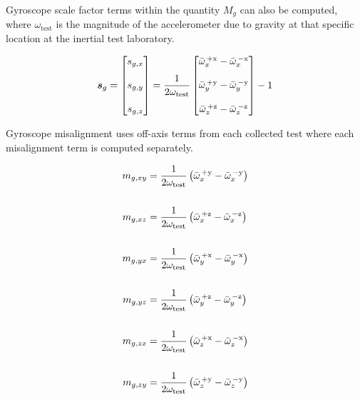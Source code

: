 Gyroscope scale factor terms within the quantity $M_g$ can also be computed, where $\omega_{\textrm{test}}$ is the magnitude of the accelerometer due to gravity at that specific location at the inertial test laboratory.

\begin{align} \label{eq: traditional gyro scale factor computation}
	\boldsymbol{s}_g = \begin{bmatrix} s_{g,x} \\ \\ s_{g,y} \\ \\ s_{g,z} \end{bmatrix} = \frac{1}{2\omega_{\textrm{test}}} \begin{bmatrix}
		\bar{\omega}^{\,+\textrm{x}}_{x} - \bar{\omega}^{\,-\textrm{x}}_{x} \\
		\\
		\bar{\omega}^{\,+\textrm{y}}_{y} - \bar{\omega}^{\,-\textrm{y}}_{y} \\
		\\
		\bar{\omega}^{\,+\textrm{z}}_{z} - \bar{\omega}^{\,-\textrm{z}}_{z}
	\end{bmatrix} - 1
\end{align}

Gyroscope misalignment uses off-axis terms from each collected test where each misalignment term is computed separately.

\begin{align} \label{eq: traditional gyro misalignment computation}
	m_{g,xy} &= \frac{1}{2\omega_{\textrm{test}}} \left( \bar{\omega}^{\,+\textrm{y}}_{x} - \bar{\omega}^{\,-\textrm{y}}_{x} \right) \notag\\
	\notag\\
	m_{g,xz} &= \frac{1}{2\omega_{\textrm{test}}} \left( \bar{\omega}^{\,+\textrm{z}}_{x} - \bar{\omega}^{\,-\textrm{z}}_{x} \right) \notag\\
	\notag\\
	m_{g,yx} &= \frac{1}{2\omega_{\textrm{test}}} \left( \bar{\omega}^{\,+\textrm{x}}_{y} - \bar{\omega}^{\,-\textrm{x}}_{y} \right) \notag\\
	\\
	m_{g,yz} &= \frac{1}{2\omega_{\textrm{test}}} \left( \bar{\omega}^{\,+\textrm{z}}_{y} - \bar{\omega}^{\,-\textrm{z}}_{y} \right) \notag\\
	\notag\\
	m_{g,zx} &= \frac{1}{2\omega_{\textrm{test}}} \left( \bar{\omega}^{\,+\textrm{x}}_{z} - \bar{\omega}^{\,-\textrm{x}}_{z} \right) \notag\\
	\notag\\
	m_{g,zy} &= \frac{1}{2\omega_{\textrm{test}}} \left( \bar{\omega}^{\,+\textrm{y}}_{z} - \bar{\omega}^{\,-\textrm{y}}_{z} \right) \notag
\end{align}